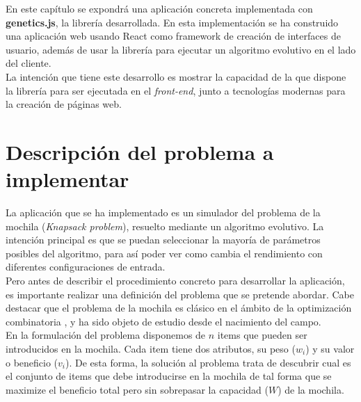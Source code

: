 

En este capítulo se expondrá una aplicación concreta implementada con \textbf{genetics.js}, la librería desarrollada. En esta implementación se ha construido una aplicación web usando React como framework de creación de interfaces de usuario, además de usar la librería para ejecutar un algoritmo evolutivo en el lado del cliente. \\

La intención que tiene este desarrollo es mostrar la capacidad de la que dispone la librería para ser ejecutada en el \textit{front-end}, junto a tecnologías modernas para la creación de páginas web. \\

\section{Descripción del problema a implementar}

La aplicación que se ha implementado es un simulador del problema de la mochila (\textit{Knapsack problem}), resuelto mediante un algoritmo evolutivo. La intención principal es que se puedan seleccionar la mayoría de parámetros posibles del algoritmo, para así poder ver como cambia el rendimiento con diferentes configuraciones de entrada. \\

Pero antes de describir el procedimiento concreto para desarrollar la aplicación, es importante realizar una definición del problema que se pretende abordar. Cabe destacar que el problema de la mochila es clásico en el ámbito de la optimización combinatoria \cite{karp1972reducibility}, y ha sido objeto de estudio desde el nacimiento del campo. \\

En la formulación del problema disponemos de $n$ items que pueden ser introducidos en la mochila. Cada item tiene dos atributos, su peso ($w_i$) y su valor o beneficio ($v_i$). De esta forma, la solución al problema trata de descubrir cual es el conjunto de items que debe introducirse en la mochila de tal forma que se maximize el beneficio total pero sin sobrepasar la capacidad ($W$) de la mochila. \\

